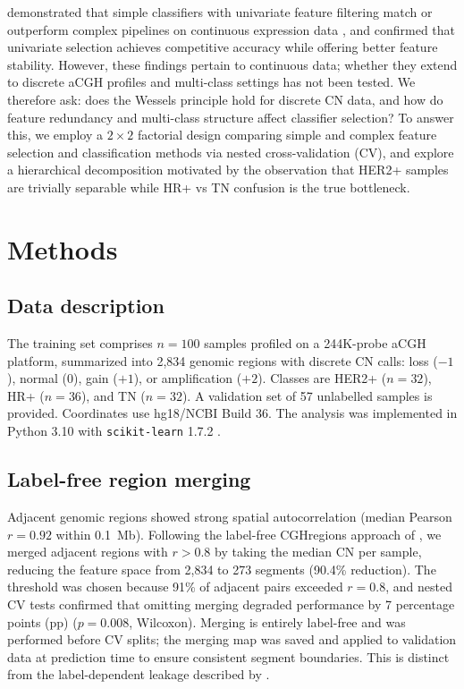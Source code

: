 \documentclass[11pt,a4paper,twocolumn]{article}
\begin{document}
\citet{wessels2005protocol} demonstrated that simple classifiers with univariate feature filtering match or outperform complex pipelines on continuous expression data \citep{vantveer2002gene}, and \citet{haury2011influence} confirmed that univariate selection achieves competitive accuracy while offering better feature stability. However, these findings pertain to continuous data; whether they extend to discrete aCGH profiles and multi-class settings has not been tested. We therefore ask: does the Wessels principle hold for discrete CN data, and how do feature redundancy and multi-class structure affect classifier selection? To answer this, we employ a $2 \times 2$ factorial design comparing simple and complex feature selection and classification methods via nested cross-validation (CV), and explore a hierarchical decomposition motivated by the observation that HER2+ samples are trivially separable while HR+ vs TN confusion is the true bottleneck.

\section{Methods}
\label{sec:methods}

\subsection{Data description}
\label{sec:data}

The training set comprises $n = 100$ samples profiled on a 244K-probe aCGH platform, summarized into 2,834 genomic regions with discrete CN calls: loss ($-1$), normal ($0$), gain ($+1$), or amplification ($+2$). Classes are HER2+ ($n = 32$), HR+ ($n = 36$), and TN ($n = 32$). A validation set of 57 unlabelled samples is provided. Coordinates use hg18/NCBI Build 36. The analysis was implemented in Python 3.10 with \texttt{scikit-learn} 1.7.2 \citep{pedregosa2011sklearn}.

\subsection{Label-free region merging}
\label{sec:merging}

Adjacent genomic regions showed strong spatial autocorrelation (median Pearson $r = 0.92$ within 0.1~Mb). Following the label-free CGHregions approach of \citet{vanwieringen2007cghregions}, we merged adjacent regions with $r > 0.8$ by taking the median CN per sample, reducing the feature space from 2,834 to 273 segments (90.4\% reduction). The threshold was chosen because 91\% of adjacent pairs exceeded $r = 0.8$, and nested CV tests confirmed that omitting merging degraded performance by 7 percentage points (pp) ($p = 0.008$, Wilcoxon). Merging is entirely label-free and was performed before CV splits; the merging map was saved and applied to validation data at prediction time to ensure consistent segment boundaries. This is distinct from the label-dependent leakage described by \citet{ambroise2002selection}.
\end{document}
